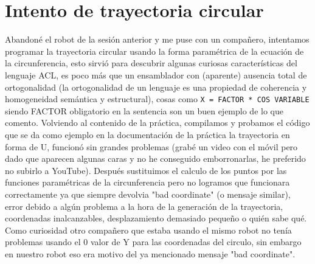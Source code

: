 \documentclass[paper=a4, fontsize=11pt]{scrreprt} %
\numberwithin{equation}{section} %
\numberwithin{figure}{section} %
\numberwithin{table}{section} %
\begin{document}
    \chapter{Intento de trayectoria circular}
    Abandoné el robot de la sesión anterior y me puse con un compañero, intentamos programar la trayectoria circular usando la forma paramétrica de la ecuación de la circunferencia, esto sirvió para descubrir algunas curiosas características del lenguaje ACL, es poco más que un ensamblador con (aparente) ausencia total de ortogonalidad (la  ortogonalidad de un lenguaje es una propiedad de coherencia y homogeneidad semántica y estructural), cosas como \lstinline{X = FACTOR * COS VARIABLE} siendo FACTOR obligatorio en la sentencia son un buen ejemplo de lo que comento.
    \newline
    Volviendo al contenido de la práctica, compilamos y probamos el código que se da como ejemplo en la documentación de la práctica la trayectoria en forma de U, funcionó sin grandes problemas (grabé un video con el móvil pero dado que aparecen algunas caras y no he conseguido emborronarlas, he preferido no subirlo a YouTube). Después sustituimos el calculo de los puntos por las funciones paramétricas de la circunferencia pero no logramos que funcionara correctamente ya que siempre devolvia "bad coordinate" (o mensaje similar), error debido a algún problema a la hora de la generación de la trayectoria, coordenadas inalcanzables, desplazamiento demasiado pequeño o quién sabe qué. Como curiosidad otro compañero que estaba usando el mismo robot no tenía problemas usando el 0 valor de Y para las coordenadas del circulo, sin embargo en nuestro robot eso era motivo del ya mencionado mensaje "bad coordinate".
    \newline
    
\end{document}
